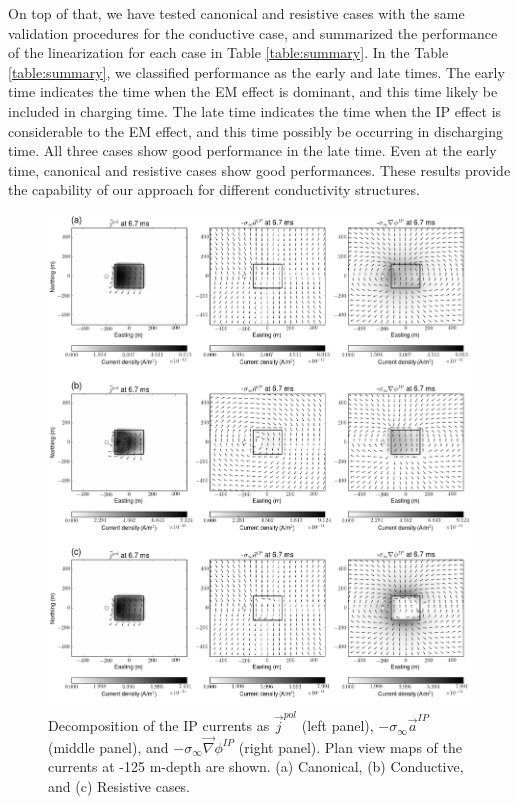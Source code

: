 \documentclass[a4paper, 11pt]{article}
\newcommand{\grad}{\vec \nabla}
\newcommand{\siginf}{\sigma_\infty}
\renewcommand {\j}  { {\vec j} }
\begin{document}
On top of that, we have tested canonical and resistive cases with the same validation procedures for the conductive case, and summarized the performance of the linearization for each case in Table \ref{table:summary}. 
In the Table \ref{table:summary}, we classified performance as the early and late times. 
The early time indicates the time when the EM effect is dominant, and this time likely be included in charging time. 
The late time indicates the time when the IP effect is considerable to the EM effect, and this time possibly be occurring in discharging time.
All three cases show good performance in the late time.
Even at the early time, canonical and resistive cases show good performances. 
These results provide the capability of our approach for different conductivity structures. 

\begin{figure}[htb]
  \centering
  \includegraphics[width=1.\textwidth]{figures/IPcurrents_helmholtz.png}
  \caption{Decomposition of the IP currents as $\j^{pol}$ (left panel), $-\siginf\vec{a}^{IP}$ (middle panel), and $-\siginf\grad\phi^{IP}$ (right panel). Plan view maps of the currents at -125 m-depth are shown. (a) Canonical, (b) Conductive, and (c) Resistive cases. }
  \label{F:IPcurrents_helmholtz}
\end{figure}
\end{document}
